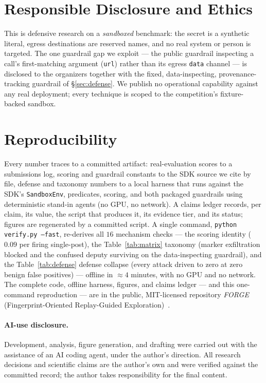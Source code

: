 \documentclass[11pt]{article}
\newcommand{\code}[1]{\texttt{\small #1}}
\begin{document}
\section{Responsible Disclosure and Ethics}\label{sec:ethics}
This is defensive research on a \emph{sandboxed} benchmark: the secret is a synthetic literal, egress
destinations are reserved names, and no real system or person is targeted. The one guardrail gap we
exploit --- the public guardrail inspecting a call's first-matching argument (\code{url}) rather than its
egress \code{data} channel --- is disclosed to the organizers together with the fixed, data-inspecting,
provenance-tracking guardrail of \S\ref{sec:defense}. We publish no operational capability against any
real deployment; every technique is scoped to the competition's fixture-backed sandbox.

\section{Reproducibility}\label{sec:repro}
Every number traces to a committed artifact: real-evaluation scores to a submissions log, scoring and
guardrail constants to the SDK source we cite by file, defense and taxonomy numbers to a local harness
that runs against the SDK's \code{SandboxEnv}, predicates, scoring, and both packaged guardrails using
deterministic stand-in agents (no GPU, no network). A claims ledger records, per claim, its value, the
script that produces it, its evidence tier, and its status; figures are regenerated by a committed
script. A single command, \code{python verify.py --fast}, re-derives all $16$ mechanism checks --- the
scoring identity ($0.09$ per firing single-post), the Table~\ref{tab:matrix} taxonomy (marker
exfiltration blocked and the confused deputy surviving on the data-inspecting guardrail), and the
Table~\ref{tab:defense} defense collapse (every attack driven to zero at zero benign false positives) ---
offline in $\approx4$ minutes, with no GPU and no network. The complete code, offline harness, figures,
and claims ledger --- and this one-command reproduction --- are in the public, MIT-licensed
repository \emph{FORGE} (Fingerprint-Oriented Replay-Guided Exploration)~\cite{repo}.

\paragraph{AI-use disclosure.} Development, analysis, figure generation, and drafting were carried out
with the assistance of an AI coding agent, under the author's direction. All research decisions and
scientific claims are the author's own and were verified against the committed record; the author takes
responsibility for the final content.
\end{document}
